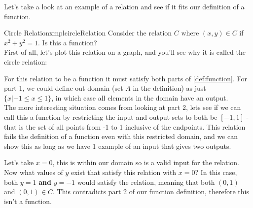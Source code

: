Let's take a look at an example of a relation and see if it fits our definition of a function.
\newpage
\begin{exmpl}[label={exmpl:circleRelation}]{Circle Relation}{xmplcircleRelation}
    Consider the relation $C$ where $(x,y) \in C$ if $x^2 + y^2 = 1$. Is this a function?\\

    First of all, let's plot this relation on a graph, and you'll see why it is called the circle relation:
    \begin{center}
    \end{center}
    For this relation to be a function it must satisfy both parts of \cref{def:function}. For part 1, we could define out domain (set $A$ in the definition) as just $\{x | -1 \leq x \leq 1\}$, in which case all elements in the domain have an output.\\
    The more interesting situation comes from looking at part 2, lets see if we can call this a function by restricting the input and output sets to both be $[-1,1]$ - that is the set of all points from -1 to 1 inclusive of the endpoints. This relation fails the definition of a function even with this restricted domain, and we can show this as long as we have 1 example of an input that gives two outputs.

    Let's take $x = 0$, this is within our domain so is a valid input for the relation. Now what values of $y$ exist that satisfy this relation with $x = 0$? In this case, both $y = 1$ \textbf{and} $y = -1$ would satisfy the relation, meaning that both $(0,1)$ and $(0,1) \in C$. This contradicts part 2 of our function definition, therefore this isn't a function.
\end{exmpl}

